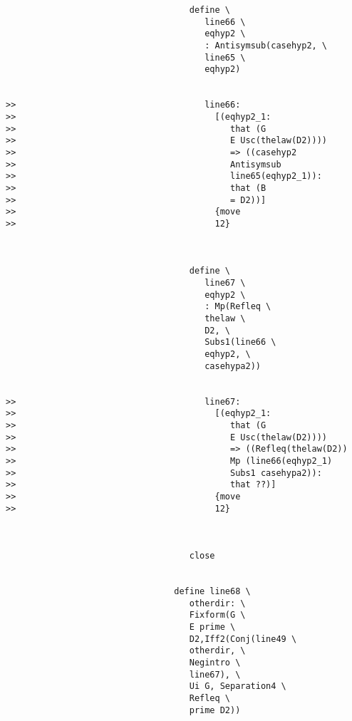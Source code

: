 \documentclass[12pt]{article}
\begin{document}
\begin{verbatim}
                                    define \
                                       line66 \
                                       eqhyp2 \
                                       : Antisymsub(casehyp2, \
                                       line65 \
                                       eqhyp2)


>>                                     line66:
>>                                       [(eqhyp2_1:
>>                                          that (G
>>                                          E Usc(thelaw(D2))))
>>                                          => ((casehyp2
>>                                          Antisymsub
>>                                          line65(eqhyp2_1)):
>>                                          that (B
>>                                          = D2))]
>>                                       {move
>>                                       12}



                                    define \
                                       line67 \
                                       eqhyp2 \
                                       : Mp(Refleq \
                                       thelaw \
                                       D2, \
                                       Subs1(line66 \
                                       eqhyp2, \
                                       casehypa2))


>>                                     line67:
>>                                       [(eqhyp2_1:
>>                                          that (G
>>                                          E Usc(thelaw(D2))))
>>                                          => ((Refleq(thelaw(D2))
>>                                          Mp (line66(eqhyp2_1)
>>                                          Subs1 casehypa2)):
>>                                          that ??)]
>>                                       {move
>>                                       12}



                                    close


                                 define line68 \
                                    otherdir: \
                                    Fixform(G \
                                    E prime \
                                    D2,Iff2(Conj(line49 \
                                    otherdir, \
                                    Negintro \
                                    line67), \
                                    Ui G, Separation4 \
                                    Refleq \
                                    prime D2))



\end{verbatim}
\end{document}
